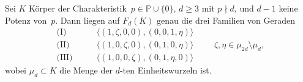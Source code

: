 \begin{fact}
Sei $K$ Körper der Charakteristik~$p \in \mathbb P \cup \{0\}$, $d \geq 3$ mit $p \nmid d$, und $d-1$ keine Potenz von~$p$. Dann liegen auf $F_d(K)$ genau die drei Familien von Geraden
\begin{equation} \label{eq:regular}
\begin{split}
\text{(I)}\qquad	&\langle (1,\zeta,0,0), (0,0,1,\eta)\rangle \\
\text{(II)}\qquad	&\langle (1,0,\zeta,0), (0,1,0,\eta)\rangle \\
\text{(III)}\qquad	&\langle (1,0,0,\zeta), (0,1,\eta,0)\rangle
\end{split} \qquad \zeta, \eta \in \mu_{2d} \setminus \mu_d,
\end{equation}
wobei $\mu_d \subset K$ die Menge der $d$-ten Einheitswurzeln ist.
\end{fact}
